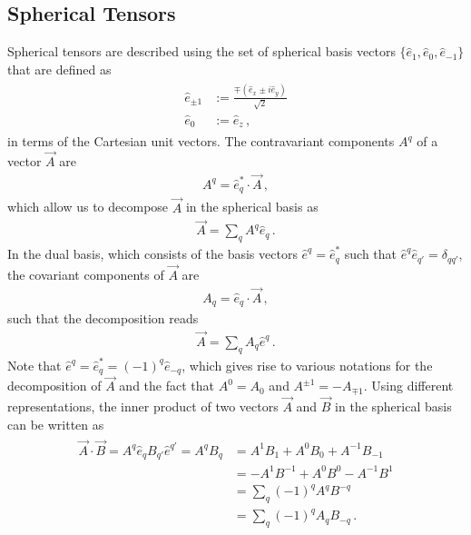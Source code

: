 \documentclass[../Thesis-IJspeert.tex]{subfiles}
\begin{document}
\begin{appendices}
\chapter{Spherical Tensors}
\label{sphericaltensors}
Spherical tensors are described using the set of spherical basis vectors $\{\hat{e}_1, \hat{e}_0, \hat{e}_{-1}\}$ that are defined as
\begin{align}
\begin{split}
	\hat{e}_{\pm 1} &:= \frac{\mp(\hat{e}_x\pm i \hat{e}_y)}{\sqrt{2}}\\ \hat{e}_0&:=\hat{e}_z\,,
\end{split}
\end{align}
in terms of the Cartesian unit vectors. The contravariant components $A^q$ of a vector $\vec{A}$ are
\begin{align}
	A^q=\hat{e}_q^*\cdot \vec{A}\,,
\end{align}
which allow us to decompose $\vec{A}$ in the spherical basis as
\begin{align}
	\vec{A}=\sum_q A^q \hat{e}_q\,.
\end{align}
In the dual basis, which consists of the basis vectors $\hat{e}^q=\hat{e}_q^*$ such that $\hat{e}^q\hat{e}_{q'}=\delta_{qq'}$, the covariant components of $\vec{A}$ are
\begin{align}
	A_q = \hat{e}_q\cdot \vec{A}\,,
\end{align} 
such that the decomposition reads
\begin{align}
	\vec{A}=\sum_q A_q \hat{e}^q\,.
\end{align}
Note that $\hat{e}^q=\hat{e}_q^*=(-1)^q\hat{e}_{-q}$, which gives rise to various notations for the decomposition of $\vec{A}$ and the fact that $A^0=A_0$ and $A^{\pm 1}= -A_{\mp 1}$. Using different representations, the inner product of two vectors $\vec{A}$ and $\vec{B}$ in the spherical basis can be written as
\begin{align}
\begin{split}
	\vec{A}\cdot\vec{B}= A^q \hat{e}_q B_{q'} \hat{e}^{q'} = A^q B_q &= A^1 B_1 + A^0 B_0 + A^{-1} B_{-1} \\&= -A^1 B^{-1} + A^0 B^0 - A^{-1} B^1 \\&= \sum_q (-1)^q A^q B^{-q} \\&= \sum_q (-1)^q A_q B_{-q}\,.
\end{split}
\end{align}

\end{appendices}
\end{document}

